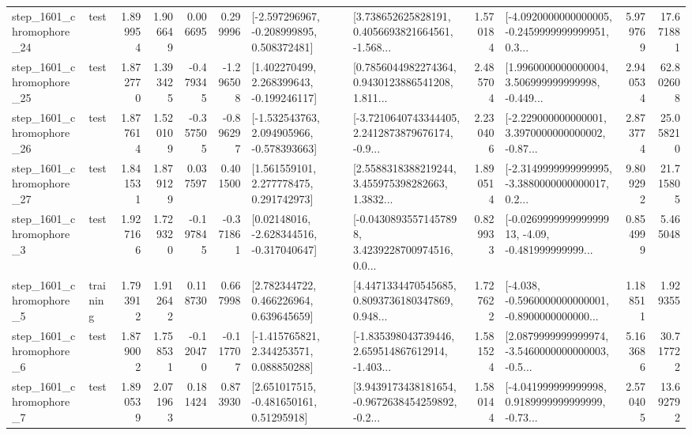 \begin{tabular}{llrrrrllrlrr}
 step\_1601\_chromophore\_24 &      test &      1.899954 &    1.906649 &      0.006695 &  0.299996 &   [-2.597296967, -0.208999895, 0.508372481] &  [3.738652625828191, 0.4056693821664561, -1.568... &       1.570184 &  [-4.0920000000000005, -0.2459999999999951, 0.3... &            5.979769 &         17.671881 \\
 step\_1601\_chromophore\_25 &      test &      1.872770 &    1.393425 &     -0.479345 & -1.296508 &    [1.402270499, 2.268399643, -0.199246117] &  [0.7856044982274364, 0.9430123886541208, 1.811... &       2.485704 &  [1.9960000000000004, 3.506999999999998, -0.449... &            2.940534 &         62.802608 \\
 step\_1601\_chromophore\_26 &      test &      1.877614 &    1.520109 &     -0.357505 & -0.896297 &   [-1.532543763, 2.094905966, -0.578393663] &  [-3.7210640743344405, 2.2412873879676174, -0.9... &       2.230406 &  [-2.229000000000001, 3.3970000000000002, -0.87... &            2.873774 &         25.058210 \\
 step\_1601\_chromophore\_27 &      test &      1.841531 &    1.879129 &      0.037597 &  0.401500 &     [1.561559101, 2.277778475, 0.291742973] &  [2.5588318388219244, 3.455975398282663, 1.3832... &       1.890514 &  [-2.3149999999999995, -3.3880000000000017, 0.2... &            9.809292 &         21.715805 \\
  step\_1601\_chromophore\_3 &      test &      1.927166 &    1.729320 &     -0.197845 & -0.371861 &    [0.02148016, -2.628344516, -0.317040647] &  [-0.04308935571457898, 3.4239228700974516, 0.0... &       0.829933 &  [-0.026999999999999913, -4.09, -0.481999999999... &            0.854999 &          5.465048 \\
  step\_1601\_chromophore\_5 &  training &      1.793912 &    1.912642 &      0.118730 &  0.667998 &     [2.782344722, 0.466226964, 0.639645659] &  [4.4471334470545685, 0.8093736180347869, 0.948... &       1.727622 &  [-4.038, -0.5960000000000001, -0.8900000000000... &            1.188511 &          1.929355 \\
  step\_1601\_chromophore\_6 &      test &      1.879002 &    1.758531 &     -0.120470 & -0.117707 &    [-1.415765821, 2.344253571, 0.088850288] &  [-1.835398043739446, 2.659514867612914, -1.403... &       1.581524 &  [2.0879999999999974, -3.5460000000000003, -0.5... &            5.163686 &         30.717722 \\
  step\_1601\_chromophore\_7 &      test &      1.890539 &    2.071963 &      0.181424 &  0.873930 &     [2.651017515, -0.481650161, 0.51295918] &  [3.9439173438181654, -0.9672638454259892, -0.2... &       1.580144 &  [-4.041999999999998, 0.9189999999999999, -0.73... &            2.570405 &         13.692792 \\

\end{tabular}

